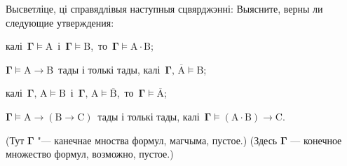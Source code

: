 \documentclass[12pt, a4paper]{article}
\begin{document}
\begin{problemList}
\smallskip

\problemItemWithCommonPartComplicated
{Высветліце, ці справядлівыя наступныя сцвярджэнні:}
{Выясните, верны ли следующие утверждения:}
{%
\begin{belarusianEnumerate}
    \item калі\, $\boldsymbol{\Gamma} \vDash \boldsymbol{\mathrm{A}}$\, і\, $\boldsymbol{\Gamma}
    \vDash \boldsymbol{\mathrm{B}}$,\, то\, $\boldsymbol{\Gamma} \vDash \boldsymbol{\mathrm{A}} \cdot
    \boldsymbol{\mathrm{B}}$;
    \item $\boldsymbol{\Gamma} \vDash \boldsymbol{\mathrm{A}} \to \boldsymbol{\mathrm{B}}$\, тады
    і толькі тады, калі\, $\boldsymbol{\Gamma},\, \overline{\boldsymbol{\mathrm{A}}} \vDash \boldsymbol{\mathrm{B}}$;
    \item калі\, $\boldsymbol{\Gamma},\, \boldsymbol{\mathrm{A}} \vDash \boldsymbol{\mathrm{B}}$\, і\,
    $\boldsymbol{\Gamma},\, \boldsymbol{\mathrm{A}} \vDash \overline{\boldsymbol{\mathrm{B}}}$,\, то\,
    $\boldsymbol{\Gamma} \vDash \overline{\boldsymbol{\mathrm{A}}}$;
    \item $\boldsymbol{\Gamma} \vDash \boldsymbol{\mathrm{A}} \to (\boldsymbol{\mathrm{B}}
    \to \boldsymbol{\mathrm{C}})$\, тады і толькі тады, калі\, $\boldsymbol{\Gamma} \vDash  (\boldsymbol{\mathrm{A}} \cdot \boldsymbol{\mathrm{B}}) \to \boldsymbol{\mathrm{C}}$.
\end{belarusianEnumerate}
}
{(Тут $\boldsymbol{\Gamma}$ "--- канечнае мноства формул, магчыма, пустое.)}
{(Здесь $\boldsymbol{\Gamma}$ --- конечное множество формул, возможно, пустое.)}

\end{problemList}
\end{document}
